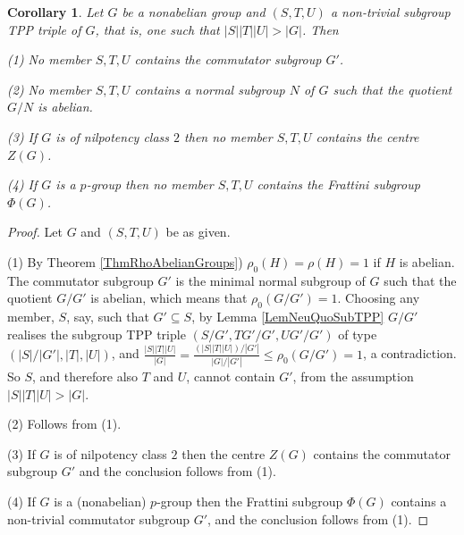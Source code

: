 \documentclass{amsart}
\theoremstyle{observation}
\newtheorem{corollary}[theorem]{Corollary}
\theoremstyle{definition}
\theoremstyle{remark}
\numberwithin{equation}{section}
\begin{document}
\begin{corollary}\label{Corr2LemNeuQuoSubTPP} Let $G$ be a nonabelian group and $(S, T, U)$ a non-trivial subgroup TPP triple of $G$, that is, one such that $|S||T||U| > |G|$. Then 

\vspace{1mm}

\textup{(1)} No member $S, T, U$ contains the commutator subgroup $G'$.

\vspace{1mm}

\textup{(2)} No member $S, T, U$ contains a normal subgroup $N$ of $G$ such that the quotient $G/N$ is abelian.

\vspace{1mm}

\textup{(3)} If $G$ is of nilpotency class $2$ then no member $S, T, U$ contains the centre $Z(G)$.

\vspace{1mm}

\textup{(4)} If $G$ is a $p$-group then no member $S, T, U$ contains the Frattini subgroup $\Phi(G)$.
\end{corollary}
\begin{proof} Let $G$ and $(S, T, U)$ be as given.

\vspace{1mm}

\textup{(1)} By Theorem \ref{ThmRhoAbelianGroups}) $\rho_0(H) = \rho(H) = 1$ if $H$ is abelian. The commutator subgroup $G'$ is the minimal normal subgroup of $G$ such that the quotient $G/G'$ is abelian, which means that $\rho_0(G/G') = 1$. Choosing any member, $S$, say, such that $G' \subseteq S$, by Lemma \ref{LemNeuQuoSubTPP} $G/G'$ realises the subgroup TPP triple $(S/G', TG'/G', UG'/G')$ of type $(|S|/|G'|, |T|, |U|)$, and $\frac{|S||T||U|}{|G|} = \frac{(|S||T||U|)/|G'|}{|G|/|G'|} \leq \rho_0(G/G') = 1$, a contradiction. So $S$, and therefore also $T$ and $U$, cannot contain $G'$, from the assumption $|S||T||U| > |G|$.

\vspace{1mm}

\textup{(2)} Follows from \textup{(1)}.

\vspace{1mm}

\textup{(3)} If $G$ is of nilpotency class $2$ then the centre $Z(G)$ contains the commutator subgroup $G'$ and the conclusion follows from \textup{(1)}.

\vspace{1mm}

\textup{(4)} If $G$ is a (nonabelian) $p$-group then the Frattini subgroup $\Phi(G)$ contains a non-trivial commutator subgroup $G'$, and the conclusion follows from \textup{(1)}.
\end{proof}
\end{document}
